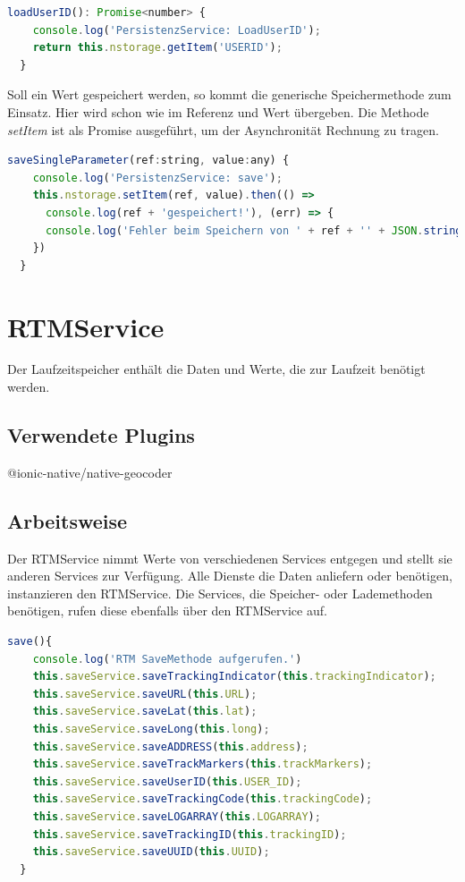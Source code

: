 \begin{lstlisting}[float, language=JavaScript, caption= Laden der UserID vom Native Storage, label=lst:LoadUserIDPersist]
loadUserID(): Promise<number> {
    console.log('PersistenzService: LoadUserID');
    return this.nstorage.getItem('USERID');
  }
\end{lstlisting}

Soll ein Wert gespeichert werden, so kommt die generische Speichermethode zum Einsatz. Hier wird schon wie im  Referenz und Wert übergeben. Die Methode \emph{setItem} ist als
Promise ausgeführt, um der Asynchronität Rechnung zu tragen. 

\begin{lstlisting}[float, language=JavaScript, caption=Generische Speichermethode für Native Storage, label=lst:SaveGeneric]
saveSingleParameter(ref:string, value:any) {
    console.log('PersistenzService: save');
    this.nstorage.setItem(ref, value).then(() =>
      console.log(ref + 'gespeichert!'), (err) => {
      console.log('Fehler beim Speichern von ' + ref + '' + JSON.stringify(err));
    })
  }
\end{lstlisting}

\section{RTMService}
\label{srv:RTMService}
Der Laufzeitspeicher enthält die Daten und Werte, die zur Laufzeit benötigt werden.
\subsection{Verwendete Plugins}
@ionic-native/native-geocoder \cite{GeocoderPluginDoku}
\subsection{Arbeitsweise}
Der RTMService nimmt Werte von verschiedenen  Services entgegen und stellt sie anderen Services zur Verfügung. Alle Dienste die Daten anliefern oder benötigen, instanzieren den RTMService. Die Services, die Speicher- oder Lademethoden benötigen, rufen diese ebenfalls über den RTMService auf.  

\begin{lstlisting}[float, language=JavaScript, caption=Methode zum Persistieren des Appzustandes beim Beenden, label=lst:saveAll]
save(){
    console.log('RTM SaveMethode aufgerufen.')
    this.saveService.saveTrackingIndicator(this.trackingIndicator);
    this.saveService.saveURL(this.URL);
    this.saveService.saveLat(this.lat);
    this.saveService.saveLong(this.long);
    this.saveService.saveADDRESS(this.address);
    this.saveService.saveTrackMarkers(this.trackMarkers);
    this.saveService.saveUserID(this.USER_ID);
    this.saveService.saveTrackingCode(this.trackingCode);
    this.saveService.saveLOGARRAY(this.LOGARRAY);
    this.saveService.saveTrackingID(this.trackingID);
    this.saveService.saveUUID(this.UUID);
  }
\end{lstlisting}


